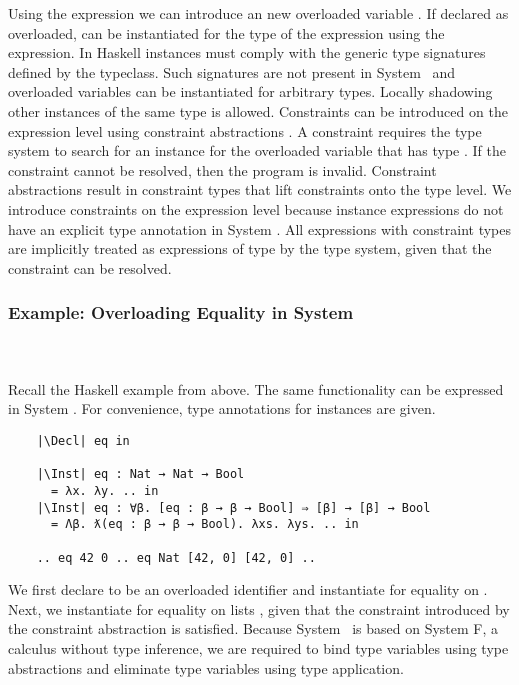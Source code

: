 \noindent Using the  expression we can introduce an new overloaded variable . 
If declared as overloaded,  can be instantiated for the type  of the expression  using the  expression.
In Haskell instances must comply with the generic type signatures defined by the typeclass. Such signatures are not present in System \Fo\ and overloaded variables can be instantiated for arbitrary types. 
Locally shadowing other instances of the same type is allowed. 
Constraints can be introduced on the expression level using constraint abstractions . A constraint  requires the type system to search for an instance for the overloaded variable  that has type . If the constraint cannot be resolved, then the program is invalid.
Constraint abstractions result in constraint types  that lift constraints onto the type level. 
We introduce constraints on the expression level because instance expressions do not have an explicit type annotation in System \Fo.
All expressions with constraint types  are implicitly treated as expressions of type  by the type system, given that the constraint  can be resolved.

\subsubsection{Example: Overloading Equality in System \Fo}\hfill\\\\
Recall the Haskell example from above. 
The same functionality can be expressed in System \Fo. 
For convenience, type annotations for instances are given.
\newpage
\begin{verbatim}
    |\Decl| eq in

    |\Inst| eq : Nat → Nat → Bool 
      = λx. λy. .. in
    |\Inst| eq : ∀β. [eq : β → β → Bool] ⇒ [β] → [β] → Bool 
      = Λβ. ƛ(eq : β → β → Bool). λxs. λys. .. in

    .. eq 42 0 .. eq Nat [42, 0] [42, 0] .. 
\end{verbatim} 
We first declare  to be an overloaded identifier and instantiate  for equality on . 
Next, we instantiate  for equality on lists \inl{[β]}, given that the constraint  introduced by the constraint abstraction is satisfied. 
Because System \Fo\ is based on System F, a calculus without type inference, we are required to bind type variables using type abstractions  and eliminate type variables using type application. 

